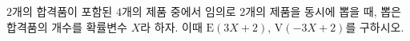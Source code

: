 $2$개의 합격품이 포함된 $4$개의 제품 중에서 임의로 $2$개의 제품을 동시에 뽑을 때, 뽑은 합격품의 개수를 확률변수 $X$라 하자. 이때 $\mathrm{E}(3X+2)$, $\mathrm{V}(-3X+2)$를 구하시오.
